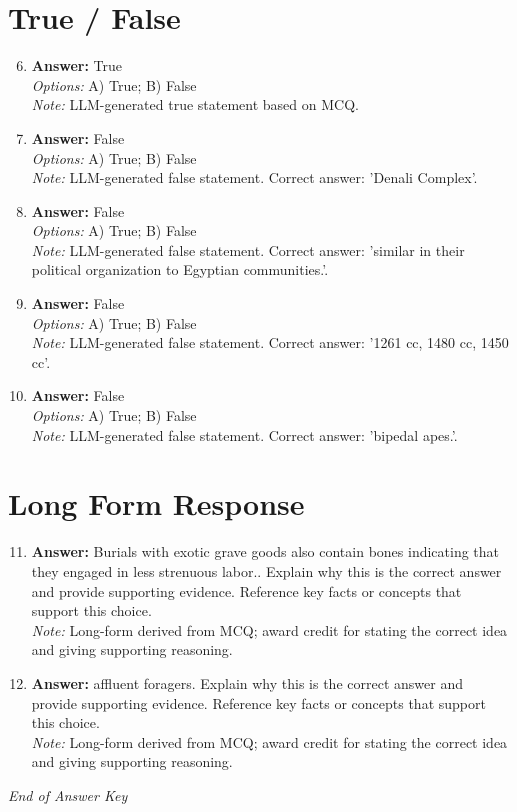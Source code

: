 \documentclass[12pt]{article}
\begin{document}
\section*{True / False}
\begin{enumerate}[label=\arabic*.]
\setcounter{enumi}{5}
\item \textbf{Answer:} True
\\ \textit{Options:} A) True; B) False
\\ \textit{Note:} LLM-generated true statement based on MCQ.
\item \textbf{Answer:} False
\\ \textit{Options:} A) True; B) False
\\ \textit{Note:} LLM-generated false statement. Correct answer: 'Denali Complex'.
\item \textbf{Answer:} False
\\ \textit{Options:} A) True; B) False
\\ \textit{Note:} LLM-generated false statement. Correct answer: 'similar in their political organization to Egyptian communities.'.
\item \textbf{Answer:} False
\\ \textit{Options:} A) True; B) False
\\ \textit{Note:} LLM-generated false statement. Correct answer: '1261 cc, 1480 cc, 1450 cc'.
\item \textbf{Answer:} False
\\ \textit{Options:} A) True; B) False
\\ \textit{Note:} LLM-generated false statement. Correct answer: 'bipedal apes.'.
\end{enumerate}

\section*{Long Form Response}
\begin{enumerate}[label=\arabic*.]
\setcounter{enumi}{10}
\item \textbf{Answer:} Burials with exotic grave goods also contain bones indicating that they engaged in less strenuous labor.. Explain why this is the correct answer and provide supporting evidence. Reference key facts or concepts that support this choice.
\\ \textit{Note:} Long-form derived from MCQ; award credit for stating the correct idea and giving supporting reasoning.
\item \textbf{Answer:} affluent foragers. Explain why this is the correct answer and provide supporting evidence. Reference key facts or concepts that support this choice.
\\ \textit{Note:} Long-form derived from MCQ; award credit for stating the correct idea and giving supporting reasoning.
\end{enumerate}

\vfill
\noindent\textit{End of Answer Key}
\end{document}
